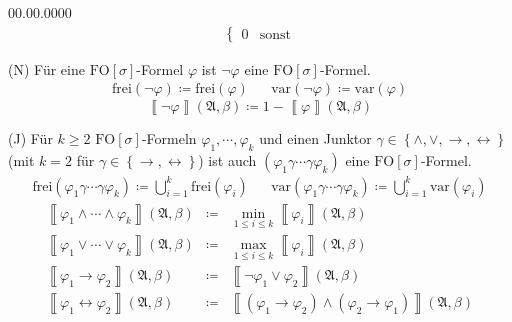 \begin{labeling}{00.00.0000}
\begin{eqnarray*}
\begin{cases}
0 & \mathrm{sonst}
\end{cases}
\end{eqnarray*}
\item [{(N)}] Für eine $\mathrm{FO}\left[\sigma\right]$-Formel $\varphi$
ist $\neg\varphi$ eine $\mathrm{FO}\left[\sigma\right]$-Formel.
\begin{eqnarray*}
\mathrm{frei}\left(\neg\varphi\right)\coloneqq\mathrm{frei}\left(\varphi\right) &  & \mathrm{var}\left(\neg\varphi\right)\coloneqq\mathrm{var}\left(\varphi\right)
\end{eqnarray*}
\[
\left\llbracket \neg\varphi\right\rrbracket \left(\mathfrak{A},\beta\right)\coloneqq1-\left\llbracket \varphi\right\rrbracket \left(\mathfrak{A},\beta\right)
\]
\item [{(J)}] Für $k\geqslant2$ $\mathrm{FO}\left[\sigma\right]$-Formeln
$\varphi_{1},\cdots,\varphi_{k}$ und einen Junktor $\gamma\in\left\{ \wedge,\vee,\rightarrow,\leftrightarrow\right\} $
(mit $k=2$ für $\gamma\in\left\{ \rightarrow,\leftrightarrow\right\} $)
ist auch $\left(\varphi_{1}\gamma\cdots\gamma\varphi_{k}\right)$
eine $\mathrm{FO}\left[\sigma\right]$-Formel. 
\begin{eqnarray*}
\mathrm{frei}\left(\varphi_{1}\gamma\cdots\gamma\varphi_{k}\right)\coloneqq\bigcup_{i=1}^{k}\mathrm{frei}\left(\varphi_{i}\right) &  & \mathrm{var}\left(\varphi_{1}\gamma\cdots\gamma\varphi_{k}\right)\coloneqq\bigcup_{i=1}^{k}\mathrm{var}\left(\varphi_{i}\right)
\end{eqnarray*}
\begin{eqnarray*}
\left\llbracket \varphi_{1}\wedge\cdots\wedge\varphi_{k}\right\rrbracket \left(\mathfrak{A},\beta\right) & \coloneqq & \min_{1\leqslant i\leqslant k}\left\llbracket \varphi_{i}\right\rrbracket \left(\mathfrak{A},\beta\right)\\
\left\llbracket \varphi_{1}\vee\cdots\vee\varphi_{k}\right\rrbracket \left(\mathfrak{A},\beta\right) & \coloneqq & \max_{1\leqslant i\leqslant k}\left\llbracket \varphi_{i}\right\rrbracket \left(\mathfrak{A},\beta\right)\\
\left\llbracket \varphi_{1}\rightarrow\varphi_{2}\right\rrbracket \left(\mathfrak{A},\beta\right) & \coloneqq & \left\llbracket \neg\varphi_{1}\vee\varphi_{2}\right\rrbracket \left(\mathfrak{A},\beta\right)\\
\left\llbracket \varphi_{1}\leftrightarrow\varphi_{2}\right\rrbracket \left(\mathfrak{A},\beta\right) & \coloneqq & \left\llbracket \left(\varphi_{1}\rightarrow\varphi_{2}\right)\wedge\left(\varphi_{2}\rightarrow\varphi_{1}\right)\right\rrbracket \left(\mathfrak{A},\beta\right)

\end{eqnarray*}
\end{labeling}
